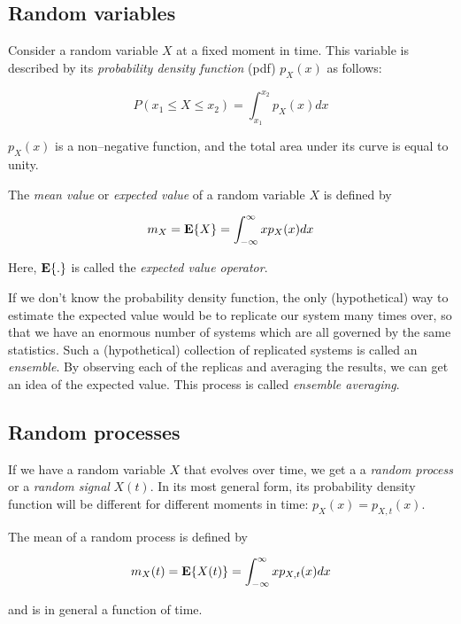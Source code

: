 \subsection{Random variables}

Consider a random variable $X$ at a fixed moment in time. This variable is described by its \emph{probability density function} (pdf) $p_X(x)$ as follows:

\begin{equation}
P(x_1 \le X \le x_2) = \int_{x_1}^{x_2}p_X(x) dx
\end{equation} 

$p_X(x)$ is a non--negative function, and the total area under its curve is equal to unity.

The \emph{mean value} or \emph{expected value} of a random variable $X$ is defined by

\begin{equation}
m_X = {\bf E}\{ X \} = \int_{-\infty}^{\infty}x p_X(x) dx
\end{equation} 

Here, ${\bf E}\{ . \}$ is called the \emph{expected value operator}.

If we don't know the probability density function, the only (hypothetical) way to estimate the expected value would be to replicate our system many times over, so that we have an enormous number of systems which are all governed by the same statistics. Such a (hypothetical) collection of replicated systems is called an \emph{ensemble}. By observing each of the replicas and averaging the results, we can get an idea of the expected value. This process is called \emph{ensemble averaging}.

\subsection{Random processes}

If we have a random variable $X$ that evolves over time, we get a a \emph{random process} or a \emph{random signal} $X(t)$. In its most general form, its probability density function will be different for different moments in time: $ p_X(x) = p_{X,t}(x)$.

The mean of a random process is defined by

\begin{equation}
m_X(t) = {\bf E}\{ X(t) \} = \int_{-\infty}^{\infty}x p_{X,t}(x) dx
\end{equation} 

and is in general a function of time.

